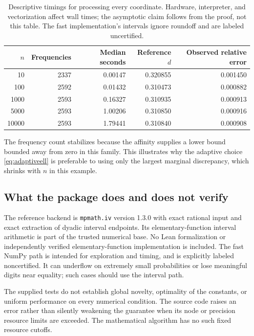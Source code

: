 \documentclass[11pt]{article}
\theoremstyle{definition}
\theoremstyle{remark}
\begin{document}
\begin{table}[htbp]
\centering\small
\begin{tabular}{@{}rrrrr@{}}
\toprule
$n$ & Frequencies & Median seconds & Reference $d$ & Observed relative error\\
\midrule
10 & 2337 & 0.00147 & 0.320855 & 0.001450\\
100 & 2592 & 0.01432 & 0.310473 & 0.000882\\
1000 & 2593 & 0.16327 & 0.310935 & 0.000913\\
5000 & 2593 & 1.00206 & 0.310850 & 0.000916\\
10000 & 2593 & 1.79441 & 0.310840 & 0.000908\\
\bottomrule
\end{tabular}
\caption{Descriptive timings for processing every coordinate. Hardware, interpreter, and vectorization affect wall times; the asymptotic claim follows from the proof, not this table. The fast implementation's intervals ignore roundoff and are labeled uncertified.}
\label{tab:scaling}
\end{table}

The frequency count stabilizes because the affinity supplies a lower bound bounded away from zero in this family. This illustrates why the adaptive choice \eqref{eq:adaptiveell} is preferable to using only the largest marginal discrepancy, which shrinks with $n$ in this example.

\subsection{What the package does and does not verify}

The reference backend is \texttt{mpmath.iv} version 1.3.0 with exact rational input and exact extraction of dyadic interval endpoints. Its elementary-function interval arithmetic is part of the trusted numerical base. No Lean formalization or independently verified elementary-function implementation is included. The fast NumPy path is intended for exploration and timing, and is explicitly labeled noncertified. It can underflow on extremely small probabilities or lose meaningful digits near equality; such cases should use the interval path.

The supplied tests do not establish global novelty, optimality of the constants, or uniform performance on every numerical condition. The source code raises an error rather than silently weakening the guarantee when its node or precision resource limits are exceeded. The mathematical algorithm has no such fixed resource cutoffs.
\end{document}
